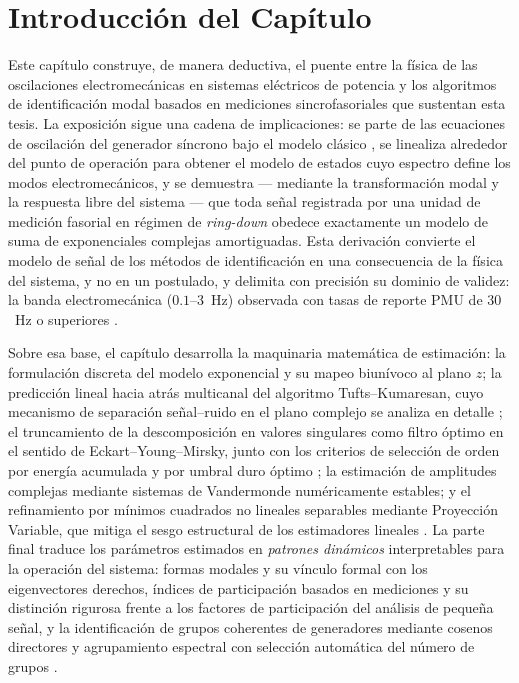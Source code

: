 \section*{Introducción del Capítulo}

Este capítulo construye, de manera deductiva, el puente entre la física de
las oscilaciones electromecánicas en sistemas eléctricos de potencia y los
algoritmos de identificación modal basados en mediciones sincrofasoriales
que sustentan esta tesis. La exposición sigue una cadena de implicaciones:
se parte de las ecuaciones de oscilación del generador síncrono bajo el
modelo clásico \cite{kundur1994}, se linealiza alrededor del punto de
operación para obtener el modelo de estados cuyo espectro define los modos
electromecánicos, y se demuestra --- mediante la transformación modal y la
respuesta libre del sistema \cite{kundur1994} --- que toda señal registrada
por una unidad de medición fasorial en régimen de \emph{ring-down} obedece
exactamente un modelo de suma de exponenciales complejas amortiguadas. Esta
derivación convierte el modelo de señal de los métodos de identificación en
una consecuencia de la física del sistema, y no en un postulado, y delimita
con precisión su dominio de validez: la banda electromecánica
($0.1$--$3$~Hz) observada con tasas de reporte PMU de $30$~Hz o superiores
\cite{sauer2017}.

Sobre esa base, el capítulo desarrolla la maquinaria matemática de
estimación: la formulación discreta del modelo exponencial y su mapeo
biunívoco al plano $z$; la predicción lineal hacia atrás multicanal del
algoritmo Tufts--Kumaresan, cuyo mecanismo de separación señal--ruido en el
plano complejo se analiza en detalle \cite{tufts1982}; el truncamiento de
la descomposición en valores singulares como filtro óptimo en el sentido de
Eckart--Young--Mirsky, junto con los criterios de selección de orden por
energía acumulada y por umbral duro óptimo \cite{brunton2022,gavish2014};
la estimación de amplitudes complejas mediante sistemas de Vandermonde
numéricamente estables; y el refinamiento por mínimos cuadrados no lineales
separables mediante Proyección Variable, que mitiga el sesgo estructural de
los estimadores lineales \cite{askham2018}. La parte final traduce los
parámetros estimados en \emph{patrones dinámicos} interpretables para la
operación del sistema: formas modales y su vínculo formal con los
eigenvectores derechos, índices de participación basados en mediciones y su
distinción rigurosa frente a los factores de participación del análisis de
pequeña señal, y la identificación de grupos coherentes de generadores
mediante cosenos directores y agrupamiento espectral con selección
automática del número de grupos \cite{jiang2021,li2018cwt,li2020era}.

